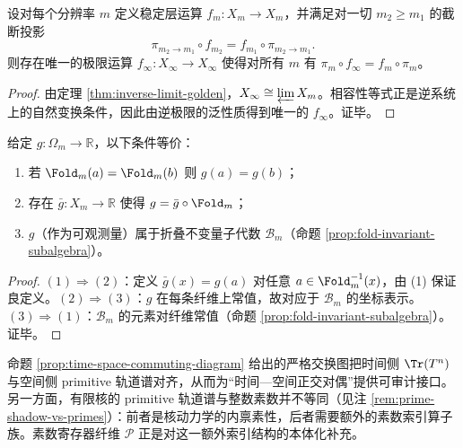 \begin{theorem}[逆极限自然性]\label{thm:pom-inverse-limit}
设对每个分辨率 $m$ 定义稳定层运算 $f_m:X_m\to X_m$，并满足对一切 $m_2\ge m_1$ 的截断投影
\[
\pi_{m_2\to m_1}\circ f_{m_2}=f_{m_1}\circ \pi_{m_2\to m_1}.
\]
则存在唯一的极限运算 $f_\infty:X_\infty\to X_\infty$ 使得对所有 $m$ 有 $\pi_m\circ f_\infty=f_m\circ \pi_m$。
\end{theorem}
\begin{proof}
由定理 \ref{thm:inverse-limit-golden}，$X_\infty\cong\varprojlim X_m$。相容性等式正是逆系统上的自然变换条件，因此由逆极限的泛性质得到唯一的 $f_\infty$。证毕。
\end{proof}

\begin{proposition}[纤维不变量判别]\label{prop:pom-fiber-invariance}
给定 $g:\Omega_m\to\mathbb{R}$，以下条件等价：
\begin{enumerate}
  \item 若 $\Fold_m(a)=\Fold_m(b)$ 则 $g(a)=g(b)$；
  \item 存在 $\bar g:X_m\to\mathbb{R}$ 使得 $g=\bar g\circ\Fold_m$；
  \item $g$（作为可观测量）属于折叠不变量子代数 $\mathcal{B}_m$（命题 \ref{prop:fold-invariant-subalgebra}）。
\end{enumerate}
\end{proposition}
\begin{proof}
$(1)\Rightarrow(2)$：定义 $\bar g(x)=g(a)$ 对任意 $a\in\Fold_m^{-1}(x)$，由 (1) 保证良定义。$(2)\Rightarrow(3)$：$g$ 在每条纤维上常值，故对应于 $\mathcal{B}_m$ 的坐标表示。$(3)\Rightarrow(1)$：$\mathcal{B}_m$ 的元素对纤维常值（命题 \ref{prop:fold-invariant-subalgebra}）。证毕。
\end{proof}

\begin{remark}[时间—空间对偶接口与素数影子]\label{rem:pom-time-space}
命题 \ref{prop:time-space-commuting-diagram} 给出的严格交换图把时间侧 $\Tr(T^n)$ 与空间侧 primitive 轨道谱对齐，从而为“时间—空间正交对偶”提供可审计接口。另一方面，有限核的 primitive 轨道谱与整数素数并不等同（见注 \ref{rem:prime-shadow-vs-primes}）：前者是核动力学的内禀素性，后者需要额外的素数索引算子族。素数寄存器纤维 $\mathcal{P}$ 正是对这一额外索引结构的本体化补充。
\end{remark}

